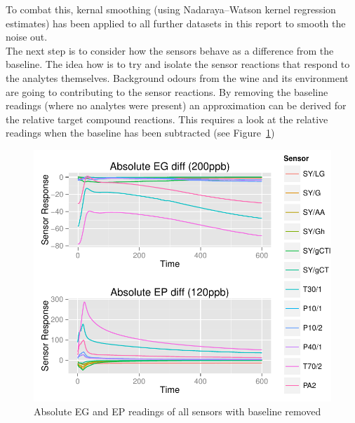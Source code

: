 \documentclass[twocolumn]{article}
\begin{document}
To combat this, kernal smoothing (using Nadaraya–Watson kernel regression estimates\cite{nwkernal}) has been applied to all further 
datasets in this report to smooth the noise out.\\
The next step is to consider how the sensors behave as a difference from the baseline. The idea how is to try
and isolate the sensor reactions that respond to the analytes themselves. Background odours from the wine and its
environment are going to contributing to the sensor reactions. By removing the baseline readings (where no analytes
were present) an approximation can be derived for the relative target compound reactions. This requires a look
at the relative readings when the baseline has been subtracted (see Figure~\ref{fig:absoluteAnalyteDiffReadings})
\begin{figure}[h!]
	\includegraphics[trim = 0mm 0mm 0mm 0mm, clip, scale=0.55]{absoluteEGEPDiffreadings.pdf}
	\caption{Absolute EG and EP readings of all sensors with baseline removed}
	\label{fig:absoluteAnalyteDiffReadings}
\end{figure}
\end{document}
